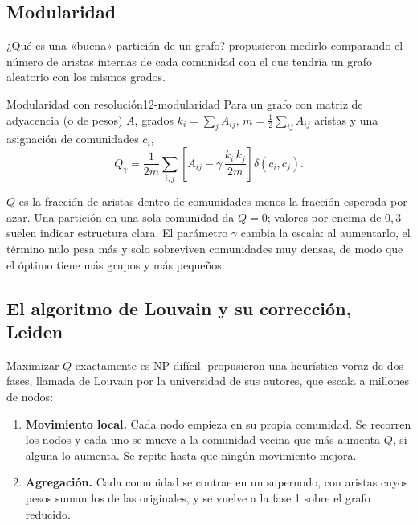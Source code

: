 \subsection{Modularidad}

¿Qué es una «buena» partición de un grafo? \textcite{c12-newman2004} propusieron medirlo comparando el número de aristas internas de cada comunidad con el que tendría un grafo aleatorio con los mismos grados.

\begin{definicion}{Modularidad con resolución}{12-modularidad}
Para un grafo con matriz de adyacencia (o de pesos) $A$, grados $k_i=\sum_j A_{ij}$, $m=\frac12\sum_{ij}A_{ij}$ aristas y una asignación de comunidades $c_i$,
\begin{equation}\label{eq:12-modularidad}
Q_\gamma = \frac{1}{2m}\sum_{i,j}\left[A_{ij}-\gamma\,\frac{k_i\,k_j}{2m}\right]\delta(c_i,c_j).
\end{equation}
\end{definicion}
\begin{simbolos}
\end{simbolos}
$Q$ es la fracción de aristas dentro de comunidades menos la fracción esperada por azar. Una partición en una sola comunidad da $Q=0$; valores por encima de $0{,}3$ suelen indicar estructura clara. El parámetro $\gamma$ cambia la escala: al aumentarlo, el término nulo pesa más y solo sobreviven comunidades muy densas, de modo que el óptimo tiene más grupos y más pequeños.

\subsection{El algoritmo de Louvain y su corrección, Leiden}

Maximizar $Q$ exactamente es NP-difícil. \textcite{c12-blondel2008} propusieron una heurística voraz de dos fases, llamada de Louvain por la universidad de sus autores, que escala a millones de nodos:

\begin{enumerate}
  \item \textbf{Movimiento local.} Cada nodo empieza en su propia comunidad. Se recorren los nodos y cada uno se mueve a la comunidad vecina que más aumenta $Q$, si alguna lo aumenta. Se repite hasta que ningún movimiento mejora.
  \item \textbf{Agregación.} Cada comunidad se contrae en un supernodo, con aristas cuyos pesos suman los de las originales, y se vuelve a la fase 1 sobre el grafo reducido.
\end{enumerate}

